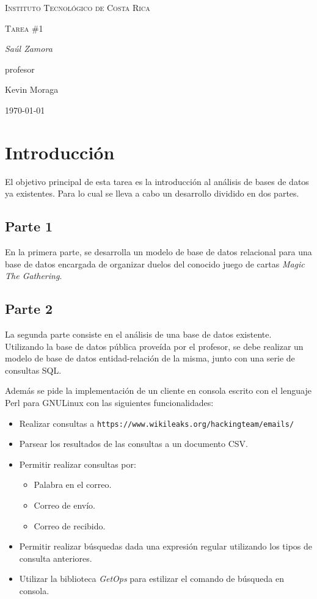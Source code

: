 \documentclass{IEEEtran}
\begin{document}
\begin{titlepage}
  \centering
  {\scshape\LARGE Instituto Tecnol\'ogico de Costa Rica \par}
  \vspace{1cm}
  {\scshape\Large Tarea \#1\par}
  \vspace{1.5cm}
  {\Large\itshape Sa\'ul Zamora\par}
  \vfill
  profesor\par
  Kevin Moraga \textsc{}

  \vfill

  {\large \today\par}
\end{titlepage}

\section{Introducci\'on}
El objetivo principal de esta tarea es la introducci\'on al an\'alisis de bases de datos ya existentes. Para lo cual se lleva a cabo un desarrollo dividido en dos partes.

\subsection{Parte 1}
En la primera parte, se desarrolla un modelo de base de datos relacional para una base de datos encargada de organizar duelos del conocido juego de cartas \emph{Magic The Gathering}.

\subsection{Parte 2}
La segunda parte consiste en el an\'alisis de una base de datos existente. Utilizando la base de datos p\'ublica prove\'ida por el profesor, se debe realizar un modelo de base de datos entidad-relaci\'on de la misma, junto con una serie de consultas SQL.

Adem\'as se pide la implementaci\'on de un cliente en consola escrito con el lenguaje Perl para GNU\/Linux con las siguientes funcionalidades:
\begin{itemize}
  \item Realizar consultas a \texttt{https://www.wikileaks.org/hackingteam/emails/}
  \item Parsear los resultados de las consultas a un documento CSV.
  \item Permitir realizar consultas por:
  \begin{itemize}
    \item Palabra en el correo.
    \item Correo de env\'io.
    \item Correo de recibido.
  \end{itemize}
  \item Permitir realizar b\'usquedas dada una expresi\'on regular utilizando los tipos de consulta anteriores.
  \item Utilizar la biblioteca \emph{GetOps} para estilizar el comando de b\'usqueda en consola.
\end{itemize}
\end{document}
